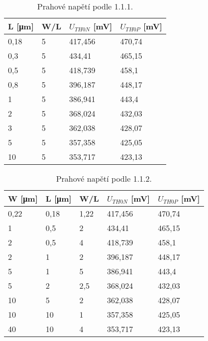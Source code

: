 \begin{table}[]
    \def\arraystretch{1.2}
    \centering
    \begin{tabular}{|l|l|l|l|}
    \hline
    L [\unit{\micro\meter}]    & W/L & \(U_{TH0 N}\) [mV] & \(U_{TH0 P}\) [mV] \\ \hline\hline
    0,18 & 5   & 417,456  & 470,74   \\ \hline
    0,3  & 5   & 434,41   & 465,15   \\ \hline
    0,5  & 5   & 418,739  & 458,1    \\ \hline
    0,8  & 5   & 396,187  & 448,17   \\ \hline
    1    & 5   & 386,941  & 443,4    \\ \hline
    2    & 5   & 368,024  & 432,03   \\ \hline
    3    & 5   & 362,038  & 428,07   \\ \hline
    5    & 5   & 357,358  & 425,05   \\ \hline
    10   & 5   & 353,717  & 423,13   \\ \hline
    \end{tabular}
    \caption{Prahové napětí podle 1.1.1.}
    \label{tab:1-1-1_hodnoty}
\end{table}

\begin{table}[]
    \def\arraystretch{1.2}
    \centering
    \begin{tabular}{|l|l|l|l|l|}
    \hline
    W [\unit{\micro\meter}]    & L [\unit{\micro\meter}]     & W/L  & \(U_{TH0 N}\) [mV] & \(U_{TH0 P}\) [mV] \\ \hline\hline
    0,22  & 0,18 & 1,22 & 417,456  & 470,74   \\ \hline
    1    & 0,5  & 2    & 434,41   & 465,15   \\ \hline
    2    & 0,5  & 4    & 418,739  & 458,1    \\ \hline
    2    & 1    & 2    & 396,187  & 448,17   \\ \hline
    5    & 1    & 5    & 386,941  & 443,4    \\ \hline
    5    & 2    & 2,5  & 368,024  & 432,03   \\ \hline
    10   & 5    & 2    & 362,038  & 428,07   \\ \hline
    10   & 10   & 1    & 357,358  & 425,05   \\ \hline
    40   & 10   & 4    & 353,717  & 423,13   \\ \hline
    \end{tabular}
    \caption{Prahové napětí podle 1.1.2.}
    \label{tab:1-1-2_hodnoty}
\end{table}



